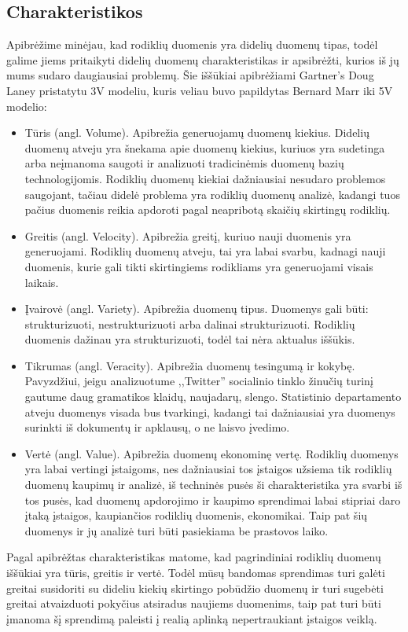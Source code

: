 \documentclass{VUMIFPSkursinis}
\begin{document}
\subsection{Charakteristikos}

Apibrėžime minėjau, kad rodiklių duomenis yra didelių duomenų tipas, todėl galime jiems pritaikyti didelių duomenų charakteristikas ir apsibrėžti, kurios iš jų 
mums sudaro daugiausiai problemų. Šie iššūkiai apibrėžiami Gartner's Doug Laney pristatytu 3V modeliu\cite{laney20013d}, kuris veliau buvo papildytas Bernard Marr iki 5V modelio\cite{marr2014big}:
\begin{itemize}
    \item Tūris (angl. Volume). Apibrežia generuojamų duomenų kiekius. Didelių duomenų atveju yra šnekama apie duomenų kiekius, kuriuos yra sudetinga arba neįmanoma saugoti 
    ir analizuoti tradicinėmis duomenų bazių technologijomis. Rodiklių duomenų kiekiai dažniausiai nesudaro problemos saugojant, tačiau didelė problema yra rodiklių duomenų analizė, 
    kadangi tuos pačius duomenis reikia apdoroti pagal neapribotą skaičių skirtingų rodiklių.
    \item Greitis (angl. Velocity). Apibrežia greitį, kuriuo nauji duomenis yra generuojami. Rodiklių duomenų atveju, tai yra labai svarbu, kadnagi nauji duomenis, kurie gali 
    tikti skirtingiems rodikliams yra generuojami visais laikais.
    \item Įvairovė (angl. Variety). Apibrežia duomenų tipus. Duomenys gali būti: strukturizuoti, nestrukturizuoti arba dalinai strukturizuoti\cite{zikopoulos2011understanding}. 
    Rodiklių duomenis dažinau yra strukturizuoti, todėl tai nėra aktualus iššūkis.
    \item Tikrumas (angl. Veracity). Apibrežia duomenų tesingumą ir kokybę. Pavyzdžiui, jeigu analizuotume ,,Twitter'' socialinio tinklo žinučių turinį gautume daug gramatikos klaidų, naujadarų, slengo. 
    Statistinio departamento atveju duomenys visada bus tvarkingi, kadangi tai dažniausiai yra duomenys surinkti iš dokumentų ir apklausų, o ne laisvo įvedimo.
    \item Vertė (angl. Value). Apibrežia duomenų ekonominę vertę. Rodiklių duomenys yra labai vertingi įstaigoms, nes dažniausiai tos įstaigos užsiema tik rodiklių duomenų kaupimų ir analizė, iš techninės pusės
    ši charakteristika yra svarbi iš tos pusės, kad duomenų apdorojimo ir kaupimo sprendimai labai stipriai daro įtaką įstaigos, kaupiančios rodiklių duomenis, ekonomikai. Taip pat šių duomenys ir jų 
    analizė turi būti pasiekiama be prastovos laiko.
\end{itemize}
    Pagal apibrėžtas charakteristikas matome, kad pagrindiniai rodiklių duomenų iššūkiai yra tūris, greitis ir vertė. Todėl mūsų bandomas sprendimas turi galėti greitai susidoriti su dideliu kiekių 
skirtingo pobūdžio duomenų ir turi sugebėti greitai atvaizduoti pokyčius atsiradus naujiems duomenims, taip pat turi būti įmanoma šį sprendimą paleisti į realią aplinką nepertraukiant įstaigos veiklą.
\end{document}
